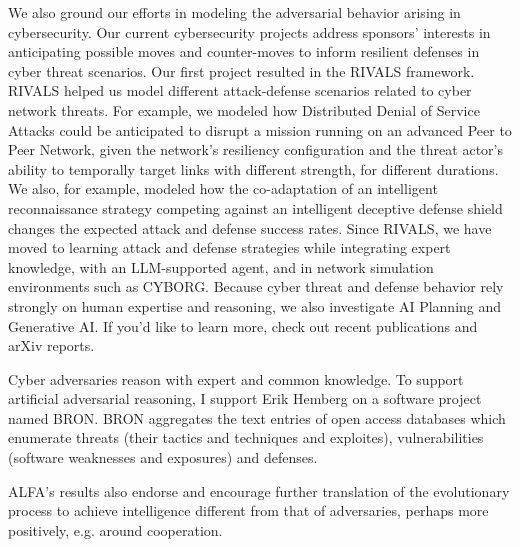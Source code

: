 \documentclass[12pt,bibliography=numbered]{article}
\renewcommand{\footnote}{\endnote}
\begin{document}
\label{Rivals}
We also ground our efforts in modeling the adversarial behavior arising in cybersecurity.  
Our current cybersecurity projects address sponsors’ interests in anticipating possible moves and counter-moves to inform resilient defenses in cyber threat scenarios.  
Our first project resulted in the RIVALS framework. RIVALS helped us model different attack-defense scenarios related to cyber network threats. For example, we modeled how Distributed Denial of Service Attacks could be anticipated to disrupt a mission running on an advanced Peer to Peer Network, given the network's resiliency configuration and the threat actor's ability to temporally target links with different strength, for different durations. We also, for example, modeled how the co-adaptation of an intelligent reconnaissance strategy competing against an intelligent deceptive defense shield changes the expected attack and defense success rates.  
\label{After Rivals}
Since RIVALS, we have moved to learning attack and defense strategies while integrating expert knowledge, with an LLM-supported agent,  and in network simulation environments such as CYBORG.  Because cyber threat and defense behavior rely strongly on human expertise and reasoning, we also investigate AI Planning and Generative AI. If you'd like to learn more, check out recent publications and arXiv reports.




Cyber adversaries reason with expert and common knowledge. To support artificial adversarial reasoning, I support Erik Hemberg on a software project named BRON. BRON  aggregates the text entries of open access databases which enumerate threats (their tactics and techniques and exploites), vulnerabilities (software weaknesses and exposures) and defenses. 
 



ALFA's results also endorse and encourage further translation of the evolutionary process to achieve intelligence different from that of adversaries, perhaps more positively, e.g. around cooperation.  

\end{document}
